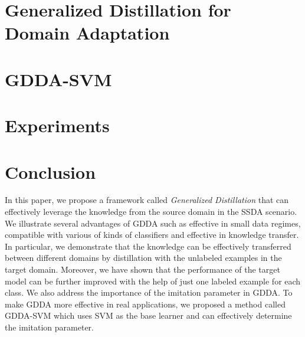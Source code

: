 \documentclass[11pt,onecolumn]{article}
\begin{document}
\section{Generalized Distillation for Domain Adaptation}\label{sec:gdda}



\section{GDDA-SVM}\label{sec:svm}


\section{Experiments}\label{sec:exp}


\section{Conclusion}\label{sec:con}
In this paper, we propose a framework called \textit{Generalized Distillation} that can effectively leverage the knowledge from the source domain in the SSDA scenario. We illustrate several advantages of GDDA such as effective in small data regimes, compatible with various of kinds of classifiers and effective in knowledge transfer. In particular, we demonstrate that the knowledge can be effectively transferred between different domains by distillation with the unlabeled examples in the target domain. Moreover, we have shown that the performance of the target model can be further improved with the help of just one labeled example for each class. We also address the importance of the imitation parameter in GDDA. To make GDDA more effective in real applications, we proposed a method called GDDA-SVM which uses SVM as the base learner and can effectively determine the imitation parameter. 


\end{document}
